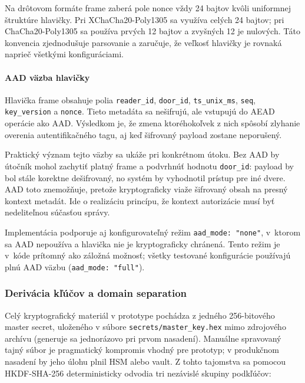 Na drôtovom formáte frame zaberá pole nonce vždy 24 bajtov kvôli uniformnej štruktúre hlavičky. Pri XChaCha20-Poly1305 sa využíva celých 24 bajtov; pri ChaCha20-Poly1305 sa používa prvých 12 bajtov a zvyšných 12 je nulových. Táto konvencia zjednodušuje parsovanie a zaručuje, že veľkosť hlavičky je rovnaká naprieč všetkými konfiguráciami.

\paragraph{AAD väzba hlavičky}

Hlavička frame obsahuje polia \texttt{reader\_id}, \texttt{door\_id}, \texttt{ts\_unix\_ms}, \texttt{seq}, \texttt{key\_version} a \texttt{nonce}. Tieto metadáta sa nešifrujú, ale vstupujú do AEAD operácie ako AAD. Výsledkom je, že zmena ktoréhokoľvek z nich spôsobí zlyhanie overenia autentifikačného tagu, aj keď šifrovaný payload zostane neporušený\cite{RFC5116}.

Praktický význam tejto väzby sa ukáže pri konkrétnom útoku. Bez AAD by útočník mohol zachytiť platný frame a podvrhnúť hodnotu \texttt{door\_id}: payload by bol stále korektne dešifrovaný, no systém by vyhodnotil prístup pre iné dvere. AAD toto znemožňuje, pretože kryptograficky viaže šifrovaný obsah na presný kontext metadát. Ide o realizáciu princípu, že kontext autorizácie musí byť nedeliteľnou súčasťou správy.

Implementácia podporuje aj konfigurovateľný režim \texttt{aad\_mode: "none"}, v~ktorom sa AAD nepoužíva a hlavička nie je kryptograficky chránená. Tento režim je v~kóde prítomný ako záložná možnosť; všetky testované konfigurácie používajú plnú AAD väzbu (\texttt{aad\_mode: "full"}).

\subsubsection{Derivácia kľúčov a domain separation}

Celý kryptografický materiál v prototype pochádza z jedného 256-bitového master secret, uloženého v súbore \texttt{secrets/master\_key.hex} mimo zdrojového archívu (generuje sa jednorázovo pri prvom nasadení). Manuálne spravovaný tajný súbor je pragmatický kompromis vhodný pre prototyp; v produkčnom nasadení by jeho úlohu plnil HSM alebo vault\cite{NIST80057}. Z tohto tajomstva sa pomocou HKDF-SHA-256\cite{RFC5869} deterministicky odvodia tri nezávislé skupiny podkľúčov:

